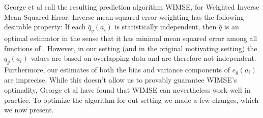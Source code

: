 George et al call the resulting prediction algorithm WIMSE, for Weighted Inverse Mean Squared Error.  Inverse-mean-squared-error weighting has the following desirable property: If each $\bar{q}_{g}(a_i)$ is statistically independent, then $\bar{q}$ is an optimal estimator in the sense that it has minimal mean squared error among all functions of \cite{}.  However, in our setting (and in the original motivating setting) the $\bar{q}_{g}(a_i)$ values are based on overlapping data and are therefore not independent.  Furthermore, our estimates of both the bias and variance components of $e_{g}(a_i)$ are imprecise. While this doesn't allow us to provably guarantee WIMSE's optimality, George et al have found that WIMSE can nevertheless work well in practice.  To optimize the algorithm for out setting we made a few changes, which we now present. 

\begin{figure}[t!]
\centering
{}
\label{fig:acs-comparison}
\end{figure}

